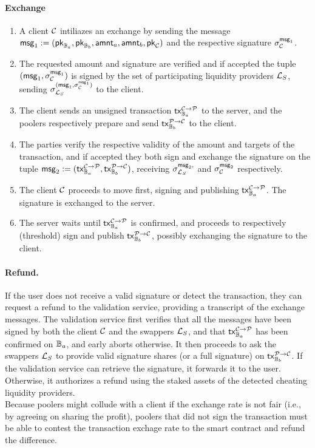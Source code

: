 \paragraph*{Exchange}
\begin{enumerate}
	\item A client $\mathcal{C}$ intiliazes an exchange by sending the message $\mathsf{msg}_1 := ( \mathsf{pk}_{\mathbb{B}_a}, \mathsf{pk}_{\mathbb{B}_b}, \mathsf{amnt}_a, \mathsf{amnt}_b, \mathsf{pk}_{\mathcal{C}})$ and the respective signature $\sigma^{\mathsf{msg}_1}_{\mathcal{C}} $.
	\item The requested amount and signature are verified and if accepted the tuple $( \mathsf{msg}_1, \sigma^{\mathsf{msg}_1}_{\mathcal{C}} )$ is signed by the set of participating liquidity providers $\mathcal{L}_{S}$, sending $\sigma^{(\mathsf{msg}_1, \sigma^{\mathsf{msg}_1}_{\mathcal{C}})}_{\mathcal{L}_{S}}$ to the client.
	\item The client sends an unsigned transaction $\mathsf{tx}^{\mathcal{C} \rightarrow \mathcal{P}}_{\mathbb{B}_a}$ to the server, and the poolers respectively prepare and send $\mathsf{tx}^{\mathcal{P} \rightarrow \mathcal{C}}_{\mathbb{B}_b}$ to the client.
	\item The parties verify the respective validity of the amount and targets of the transaction, and if accepted they both sign and exchange the signature on the tuple $\mathsf{msg}_2 := (\mathsf{tx}^{\mathcal{C} \rightarrow \mathcal{P}}_{\mathbb{B}_a}, \mathsf{tx}^{\mathcal{P} \rightarrow \mathcal{C}}_{\mathbb{B}_b})$, receiving $\sigma^{\mathsf{msg}_2,}_{\mathcal{L}_{S}}$ and $\sigma^{\mathsf{msg}_2}_{\mathcal{C}}$ respectively.
	\item The client $\mathcal{C}$ proceeds to move first, signing and publishing $\mathsf{tx}^{\mathcal{C} \rightarrow \mathcal{P}}_{\mathbb{B}_a}$. The signature is exchanged to the server.
	\item The server waits until $\mathsf{tx}^{\mathcal{C} \rightarrow \mathcal{P}}_{\mathbb{B}_a}$ is confirmed, and proceeds to respectively (threshold) sign and publish $\mathsf{tx}^{\mathcal{P} \rightarrow \mathcal{C}}_{\mathbb{B}_b}$, possibly exchanging the signature to the client.
\end{enumerate}
\paragraph*{Refund.} 
If the user does not receive a valid signature or detect the transaction, they can request a refund to the validation service, providing a transcript of the exchange messages. The validation service first verifies that all the messages have been signed by both the client $\mathcal{C}$ and the swappers $\mathcal{L}_{S}$, and that $\mathsf{tx}^{\mathcal{C} \rightarrow \mathcal{P}}_{\mathbb{B}_a}$ has been confirmed on $\mathbb{B}_a$, and early aborts otherwise. It then proceeds to ask the swappers $\mathcal{L}_{S}$ to provide valid signature shares (or a full signature) on $\mathsf{tx}^{\mathcal{P} \rightarrow \mathcal{C}}_{\mathbb{B}_b}$. If the validation service can retrieve the signature, it forwards it to the user. Otherwise, it authorizes a refund using the staked assets of the detected cheating liquidity providers. \\
Because poolers might collude with a client if the exchange rate is not fair (i.e., by agreeing on sharing the profit), poolers that did not sign the transaction must be able to contest the transaction exchage rate to the smart contract and refund the difference.
